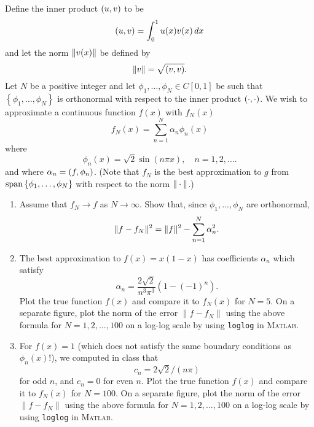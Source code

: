 Define the inner product $(u,v)$ to be
\[
(u,v)=\int_0^1u(x)v(x)\,dx
\]
and let the norm $\|v(x)\|$ be defined by
\[
\|v\|=\sqrt{(v,v)}.
\]
Let $N$ be a positive integer and let $\phi_1,\ldots,\phi_N\in C[0,1]$ be such that $\left\{\phi_1,\ldots,\phi_N\right\}$ is orthonormal with respect to the inner product $(\cdot,\cdot)$. We wish to approximate a continuous function $f(x)$ with $f_N(x)$
\[
f_N(x)=\sum_{n=1}^N\alpha_n\phi_n(x)
\]
where
\[
\phi_n(x) = \sqrt{2} \sin(n \pi x),\quad n=1,2,\ldots.
\]
and where $\alpha_n=(f,\phi_n)$. (Note that $f_N$ is the best approximation to $g$ from ${\rm span}\left\{\phi_1,\ldots,\phi_N\right\}$ with respect to the norm $\|\cdot\|$.)

\begin{enumerate}
\item Assume that $f_N \rightarrow f$ as $N\rightarrow \infty$.  Show that, since $\phi_1,\ldots,\phi_N$ are orthonormal, 
\[
\|f-f_N\|^2  = \|f\|^2 - \sum_{n=1}^N \alpha_n^2.
\]
\item The best approximation to $f(x) = x(1-x)$ has coefficients $\alpha_n$ which satisfy
\[
\alpha_n = \frac{2\sqrt{2}}{n^3\pi^3}(1-(-1)^n).
\]
Plot the true function $f(x)$ and compare it to $f_N(x)$ for $N = 5$.  On a separate figure, plot the norm of the error $\|f-f_N\|$ using the above formula for $N = 1,2,\ldots,100$ on a log-log scale by using \verb|loglog| in \textsc{Matlab}.  
\item For $f(x) = 1$  (which does not satisfy the same boundary conditions as $\phi_n(x)$!), we computed in class that 
      $$c_n = 2\sqrt{2}/(n \pi)$$
       for odd $n$, and $c_n = 0$ for even $n$.
      Plot the true function $f(x)$ and compare it to $f_N(x)$ for $N = 100$.  On a separate figure, plot the norm of the error $\|f-f_N\|$ using the above formula for $N = 1,2,\ldots,100$ on a log-log scale by using \verb|loglog| in \textsc{Matlab}.  


\end{enumerate}
